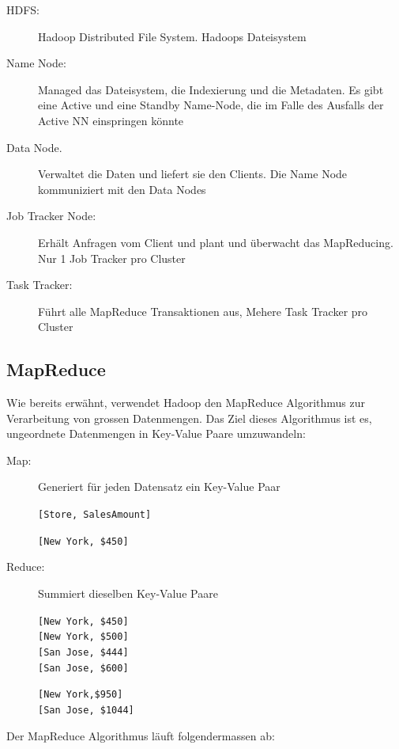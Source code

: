 \documentclass[a4paper, 11pt, nofootinbib]{article}
\newcommand{\code}[1]{\texttt{#1}}
\begin{document}
\begin{description}
	\item[HDFS: ] Hadoop Distributed File System. Hadoops Dateisystem
	\item[Name Node: ] Managed das Dateisystem, die Indexierung und die Metadaten. Es gibt eine Active und eine Standby Name-Node, die im Falle des Ausfalls der Active NN einspringen könnte
	\item[Data Node. ] Verwaltet die Daten und liefert sie den Clients. Die Name Node kommuniziert mit den Data Nodes
	\item[Job Tracker Node: ] Erhält Anfragen vom Client und plant und überwacht das MapReducing. Nur 1 Job Tracker pro Cluster
	\item[Task Tracker: ] Führt alle MapReduce Transaktionen aus, Mehere Task Tracker pro Cluster 
\end{description}

\subsection{MapReduce}
Wie bereits erwähnt, verwendet Hadoop den MapReduce Algorithmus zur Verarbeitung von grossen Datenmengen. Das Ziel dieses Algorithmus ist es, ungeordnete Datenmengen in Key-Value Paare umzuwandeln:

\begin{description}
	\item[Map: ] Generiert für jeden Datensatz ein Key-Value Paar
		\begin{multicols}{2}
			\code{[Store, SalesAmount]}
		\columnbreak
		
			\code{[New York, \$450]}	
		\end{multicols}
	\item[Reduce: ] Summiert dieselben Key-Value Paare
		\begin{multicols}{2}
			\code{[New York, \$450]}\\
			\code{[New York, \$500]}\\
			\code{[San Jose, \$444]}\\
			\code{[San Jose, \$600]}
		\columnbreak
		
			\code{[New York,\$950]}\\
			\code{[San Jose, \$1044]}
		\end{multicols}
\end{description}

\newpage

\noindent Der MapReduce Algorithmus läuft folgendermassen ab:
\end{document}
